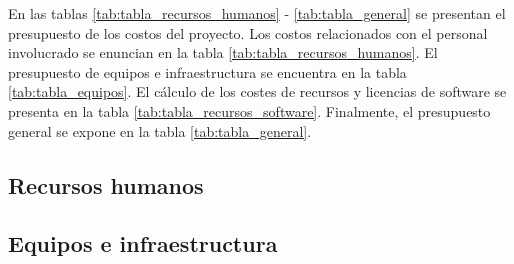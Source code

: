 En las tablas \ref{tab:tabla_recursos_humanos} - \ref{tab:tabla_general} se presentan el presupuesto de los costos del proyecto. Los costos relacionados con el personal involucrado se enuncian en la tabla \ref{tab:tabla_recursos_humanos}. El presupuesto de equipos e infraestructura se encuentra en la tabla \ref{tab:tabla_equipos}. El cálculo de los costes de recursos y licencias de software se presenta en la tabla \ref{tab:tabla_recursos_software}. Finalmente, el presupuesto general se expone en la tabla \ref{tab:tabla_general}.

\subsection{Recursos humanos}
\begin{table}[h]
\centering
{}
\caption{\hspace{2mm}Recursos humanos}
\label{tab:tabla_recursos_humanos}
\end{table}


\subsection{Equipos e infraestructura}

\begin{table}[h]
\centering
{}
\caption{\hspace{2mm}Equipos e infraestructura}
\label{tab:tabla_equipos}
\end{table}

